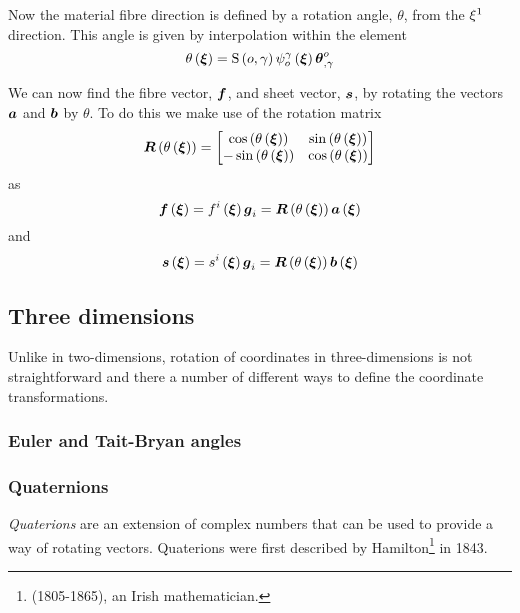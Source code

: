 Now the material fibre direction is defined by a rotation angle,
$\theta$, from the $\xi^{1}$ direction. This angle is given by
interpolation within the element \ie
\begin{equation}
   \theta\left(  \boldsymbol{\xi}  \right) =   \mathrm{S} \left( o,\gamma \right)     \psi_{o}^{\gamma} \left(  \boldsymbol{\xi}  \right)    { \boldsymbol{\theta} }^{o} _{,\gamma} 
\end{equation}

We can now find the fibre vector, $ \boldsymbol{f} $, and sheet vector,
$ \boldsymbol{s} $, by rotating the vectors $ \boldsymbol{a} $ and $ \boldsymbol{b} $ by
$\theta$. To do this we make use of the rotation matrix
\begin{equation}
  \fnof{\matr{R}}{\fnof{\theta}{\vectr{\xi}}}=\begin{bmatrix}
  \cosine{\fnof{\theta}{\vectr{\xi}}} & \sine{\fnof{\theta}{\vectr{\xi}}} \\
  -\sine{\fnof{\theta}{\vectr{\xi}}} & \cosine{\fnof{\theta}{\vectr{\xi}}}
  \end{bmatrix}
\end{equation}
as
\begin{equation}
  \fnof{\vectr{f}}{\vectr{\xi}}=\fnof{f^{i}}{\vectr{\xi}}\generalbasevector_{i}=\fnof{\matr{R}}{\fnof{\theta}{\vectr{\xi}}}\fnof{\vectr{a}}{\vectr{\xi}}
\end{equation}
and
\begin{equation}
  \fnof{\vectr{s}}{\vectr{\xi}}=\fnof{s^{i}}{\vectr{\xi}}\generalbasevector_{i}=\fnof{\matr{R}}{\fnof{\theta}{\vectr{\xi}}}\fnof{\vectr{b}}{\vectr{\xi}}
\end{equation}
  
 
\subsection{Three dimensions}
\label{subsec:MaterialCoordinateTransformationsThreeD}

Unlike in two-dimensions, rotation of coordinates in three-dimensions
is not straightforward and there a number of different ways to define
the coordinate transformations.

\subsubsection{Euler and Tait-Bryan angles}
\label{subsubsec:MaterialCoordinateTransformationsThreeDEulerTaitBryan}

\subsubsection{Quaternions}
\label{subsubsec:MaterialCoordinateTransformationsThreeDQuaternions}

\emph{Quaterions} are an extension of complex
numbers that can be used to provide a way of rotating
vectors. Quaterions were first described by
Hamilton\footnote{ (1805-1865), an Irish mathematician.} in
1843.
